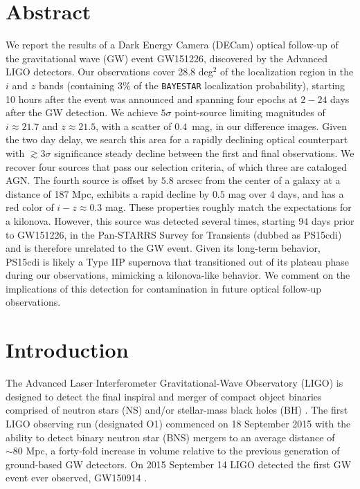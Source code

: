 
\section*{Abstract}
  We report the results of a Dark Energy Camera (DECam)
  optical follow-up of the gravitational wave (GW) event GW151226,
  discovered by the Advanced LIGO detectors. Our observations cover 28.8
  deg$^2$ of the localization region in the $i$ and $z$ bands (containing 3\% 
  of the {\tt BAYESTAR} localization probability), starting 10 hours after the 
  event was announced and spanning four epochs at $2-24$ days after the 
  GW detection. We achieve $5\sigma$ point-source limiting 
  magnitudes of $i\approx21.7$ and $z\approx21.5$, with a scatter
  of $0.4$~mag, in our difference images. Given the two day delay, 
  we search this area for a rapidly declining optical counterpart with
  $\gtrsim 3\sigma$ significance steady decline between the first and final
  observations. We recover four sources that pass our selection criteria, 
  of which three are cataloged AGN. The fourth source is offset
  by $5.8$ arcsec from the center of a galaxy at a distance of 187
  Mpc, exhibits a rapid decline by $0.5$ mag over $4$ days,
  and has a red color of $i-z\approx 0.3$ mag. These properties roughly match
  the expectations for a kilonova. However, this source
  was detected several times, starting $94$ days prior to GW151226,  
  in the Pan-STARRS Survey for Transients (dubbed as PS15cdi) and
  is therefore unrelated to the GW event. Given its long-term 
  behavior, PS15cdi is likely a Type IIP supernova that 
  transitioned out of its plateau phase during our 
  observations, mimicking a kilonova-like behavior. We comment on
  the implications of this detection for contamination in future
  optical follow-up observations. 

\section{Introduction}
\label{sec:intro}

The Advanced Laser Interferometer Gravitational-Wave Observatory
(LIGO) is designed to detect the final inspiral and
merger of compact object binaries comprised of neutron stars (NS)
and/or stellar-mass black holes (BH) \citep{abb+09}. 
The first LIGO observing run (designated O1)
commenced on 18 September 2015 with the ability to detect binary
neutron star (BNS) mergers to an average distance of $\sim 80$ Mpc, a
forty-fold increase in volume relative to the previous generation of
ground-based GW detectors. On 2015 September 14 LIGO detected 
the first GW event ever observed, GW150914 \citep{abb+16a}.

